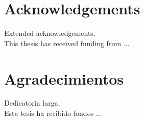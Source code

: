 \chapter*{Acknowledgements}
Extended acknowledgements.\\

\vspace*{\fill}
This thesis has received funding from ...

\chapter*{Agradecimientos}
Dedicatoria larga.\\

\vspace*{\fill}
Esta tesis ha recibido fondos ...